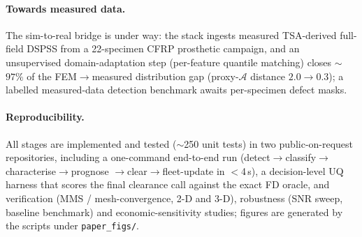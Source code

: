 \documentclass[11pt]{article}
\begin{document}
\paragraph{Towards measured data.} The sim-to-real bridge is under way: the stack
ingests measured TSA-derived full-field DSPSS from a 22-specimen CFRP prosthetic campaign,
and an unsupervised domain-adaptation step (per-feature quantile matching) closes
$\sim$$97\%$ of the FEM$\to$measured distribution gap (proxy-$\mathcal{A}$
distance $2.0\!\to\!0.3$); a labelled measured-data detection benchmark awaits
per-specimen defect masks.

\paragraph{Reproducibility.} All stages are implemented and tested
($\sim$250 unit tests) in two public-on-request repositories, including a
one-command end-to-end run (detect$\to$classify$\to$characterise$\to$prognose
$\to$clear$\to$fleet-update in $<$4\,s), a decision-level UQ harness that scores
the final clearance call against the exact FD oracle, and verification
(MMS / mesh-convergence, 2-D and 3-D), robustness (SNR sweep, baseline
benchmark) and economic-sensitivity studies; figures are generated by the
scripts under \texttt{paper\_figs/}.



\end{document}
